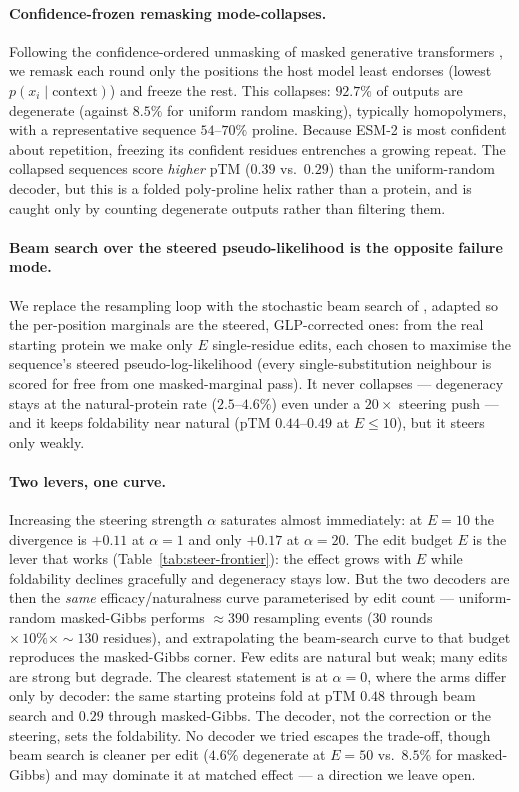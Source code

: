 \documentclass{article}
\begin{document}
\paragraph{Confidence-frozen remasking mode-collapses.} Following the confidence-ordered
unmasking of masked generative transformers \cite{chang2022maskgit}, we remask each round
only the positions the host model least endorses (lowest $p(x_i \mid \text{context})$) and
freeze the rest. This collapses: $92.7\%$ of outputs are degenerate (against $8.5\%$ for
uniform random masking), typically homopolymers, with a representative sequence $54$--$70\%$
proline. Because ESM-2 is most confident about repetition, freezing its confident residues
entrenches a growing repeat. The collapsed sequences score \emph{higher} pTM ($0.39$ vs.\
$0.29$) than the uniform-random decoder, but this is a folded poly-proline helix rather than
a protein, and is caught only by counting degenerate outputs rather than filtering them.

\paragraph{Beam search over the steered pseudo-likelihood is the opposite failure mode.} We
replace the resampling loop with the stochastic beam search of \cite{beamsearch2026plm},
adapted so the per-position marginals are the steered, GLP-corrected ones: from the real
starting protein we make only $E$ single-residue edits, each chosen to maximise the
sequence's steered pseudo-log-likelihood (every single-substitution neighbour is scored for
free from one masked-marginal pass). It never collapses --- degeneracy stays at the
natural-protein rate ($2.5$--$4.6\%$) even under a $20\times$ steering push --- and it keeps
foldability near natural (pTM $0.44$--$0.49$ at $E\!\le\!10$), but it steers only weakly.

\paragraph{Two levers, one curve.} Increasing the steering strength $\alpha$ saturates
almost immediately: at $E{=}10$ the divergence is $+0.11$ at $\alpha{=}1$ and only $+0.17$ at
$\alpha{=}20$. The edit budget $E$ is the lever that works (Table~\ref{tab:steer-frontier}):
the effect grows with $E$ while foldability declines gracefully and degeneracy stays low. But
the two decoders are then the \emph{same} efficacy/naturalness curve parameterised by edit
count --- uniform-random masked-Gibbs performs ${\approx}390$ resampling events ($30$ rounds
$\times\,10\%\times{\sim}130$ residues), and extrapolating the beam-search curve to that
budget reproduces the masked-Gibbs corner. Few edits are natural but weak; many edits are
strong but degrade. The clearest statement is at $\alpha{=}0$, where the arms differ only by
decoder: the same starting proteins fold at pTM $0.48$ through beam search and $0.29$ through
masked-Gibbs. The decoder, not the correction or the steering, sets the foldability. No
decoder we tried escapes the trade-off, though beam search is cleaner per edit ($4.6\%$
degenerate at $E{=}50$ vs.\ $8.5\%$ for masked-Gibbs) and may dominate it at matched effect
--- a direction we leave open.
\end{document}
